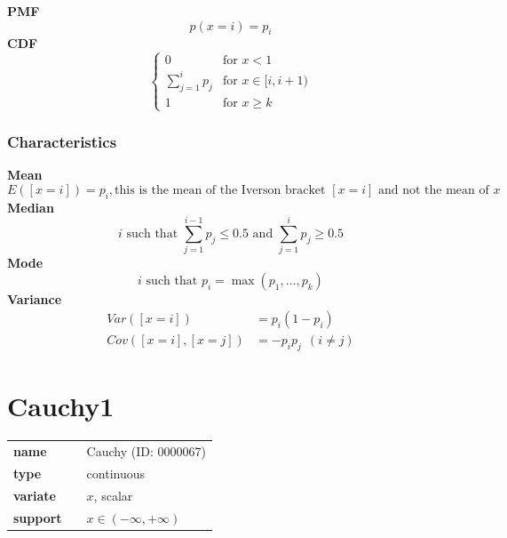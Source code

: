 \smallskip \noindent \hspace{.2cm} \textbf{PMF} 
\begin{equation*}p(x=i)=p_i\end{equation*}
\smallskip \noindent \hspace{.2cm} \textbf{CDF} 
\begin{equation*}\begin{cases}
    0 & \text{for }x<1 \\
    \sum_{j=1}^i p_j & \text{for }x \in [i,i+1) \\
    1 & \text{for }x \geq k
    \end{cases}\end{equation*}
\smallskip
\subsubsection*{Characteristics}
\smallskip \noindent \hspace{.2cm} \textbf{Mean} 
\begin{equation*}E([x=i]) = p_i, \text{this is the mean of the Iverson bracket } [x=i] \text{ and not the mean of } x\end{equation*}
\smallskip \noindent \hspace{.2cm} \textbf{Median} 
\begin{equation*}i\text{ such that }\sum_{j=1}^{i-1} p_j \leq 0.5\text{ and }\sum_{j=1}^{i} p_j \geq 0.5\end{equation*}
\smallskip \noindent \hspace{.2cm} \textbf{Mode} 
\begin{equation*}i\text{ such that }p_i=\max(p_1, \ldots, p_k)\end{equation*}
\smallskip \noindent \hspace{.2cm} \textbf{Variance} 
\begin{align*}Var([x=i]) &= p_i (1-p_i) \\ Cov([x=i],[x=j]) &= - p_i p_j~~(i\neq j)\end{align*}
\smallskip
\section*{Cauchy1} 

  \bigskip 

\begin{tabular}{p{2cm}cl}
\textbf{name} & & Cauchy (ID: 0000067)\\ 
 
\textbf{type} & & continuous \\ 

\textbf{variate} & & $x$, scalar \\ 

\textbf{support} & & $x \in (-\infty,+\infty)$
\end{tabular}

